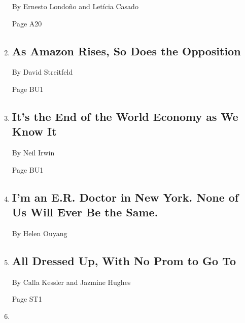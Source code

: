 \begin{enumerate}
  By Ernesto Londoño and Letícia Casado

  Page A20
\item
  \href{/2020/04/18/technology/athena-mitchell-amazon.html}{}

  \hypertarget{as-amazon-rises-so-does-the-opposition}{%
  \subsection{As Amazon Rises, So Does the
  Opposition}\label{as-amazon-rises-so-does-the-opposition}}

  By David Streitfeld

  Page BU1
\item
  \href{/2020/04/16/upshot/world-economy-restructuring-coronavirus.html}{}

  \hypertarget{its-the-end-of-the-world-economy-as-we-know-it}{%
  \subsection{It's the End of the World Economy as We Know
  It}\label{its-the-end-of-the-world-economy-as-we-know-it}}

  By Neil Irwin

  Page BU1
\item
  \href{/2020/04/14/magazine/coronavirus-er-doctor-diary-new-york-city.html}{}

  \hypertarget{im-an-er-doctor-in-new-york-none-of-us-will-ever-be-the-same}{%
  \subsection{I'm an E.R. Doctor in New York. None of Us Will Ever Be
  the
  Same.}\label{im-an-er-doctor-in-new-york-none-of-us-will-ever-be-the-same}}

  By Helen Ouyang
\item
  \href{/2020/04/17/style/prom-canceled-coronavirus.html}{}

  \hypertarget{all-dressed-up-with-no-prom-to-go-to}{%
  \subsection{All Dressed Up, With No Prom to Go
  To}\label{all-dressed-up-with-no-prom-to-go-to}}

  By Calla Kessler and Jazmine Hughes

  Page ST1
\item
  \href{/interactive/2020/04/15/arts/dutch-war-diaries.html}{}


\end{enumerate}

